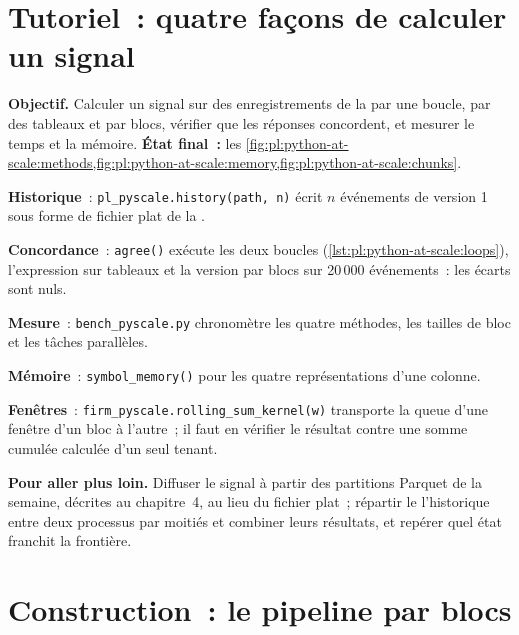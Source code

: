 \section{Tutoriel~: quatre façons de calculer un signal}\label{tut:pl:python-at-scale:tut}

\begin{tutorial}
\textbf{Objectif.} Calculer un signal sur des enregistrements de la  par une boucle, par des tableaux et par blocs, vérifier que les réponses concordent, et
mesurer le temps et la mémoire. \textbf{État final~:} les \cref{fig:pl:python-at-scale:methods,fig:pl:python-at-scale:memory,fig:pl:python-at-scale:chunks}.
\begin{tutsteps}
\item \textbf{Historique}~: \texttt{pl\_pyscale.history(path, n)} écrit $n$ événements de version 1 sous forme de fichier plat de la .
\item \textbf{Concordance}~: \texttt{agree()} exécute les deux boucles (\cref{lst:pl:python-at-scale:loops}), l'expression sur tableaux et la
version par blocs sur 20\,000 événements~: les écarts sont nuls.
\item \textbf{Mesure}~: \texttt{bench\_pyscale.py} chronomètre les quatre méthodes, les tailles de bloc et les tâches parallèles.
\item \textbf{Mémoire}~: \texttt{symbol\_memory()} pour les quatre représentations d'une colonne.
\item \textbf{Fenêtres}~: \texttt{firm\_pyscale.rolling\_sum\_kernel(w)} transporte la queue d'une fenêtre d'un bloc à l'autre~; il faut en vérifier le résultat contre une
somme cumulée calculée d'un seul tenant.
\end{tutsteps}
\textbf{Pour aller plus loin.} Diffuser le signal à partir des partitions Parquet de la semaine, décrites au chapitre~4, au lieu du fichier plat~; répartir le
l'historique entre deux processus par moitiés et combiner leurs résultats, et repérer quel état franchit la frontière.
\end{tutorial}

\section{Construction~: le pipeline par blocs}\label{bld:pl:python-at-scale:pyscale}

